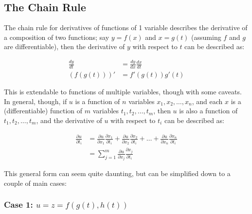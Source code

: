 \documentclass[12pt]{article}
\begin{document}


\subsection{The Chain Rule}

The chain rule for derivatives of functions of 1 variable describes the derivative of a composition of two functions; say $y=f(x)$ and $x=g(t)$ (assuming $f$ and $g$ are differentiable), then the derivative of $y$ with respect to $t$ can be described as:

\begin{equation}
    \begin{split}
       \frac{dy}{dt} &= \frac{dy}{dx}\frac{dx}{dt}\\
        (f(g(t)))' &= f'(g(t))g'(t)
    \end{split}
\end{equation}

This is extendable to functions of multiple variables, though with some caveats. In general, though, if $u$ is a function of $n$ variables $x_1, x_2, \dots, x_n$, and each $x$ is a (differentiable) function of $m$ variables $t_1, t_2, \dots, t_m$, then $u$ is also a function of $t_1, t_2, \dots, t_m$, and the derivative of $u$ with respect to $t_i$ can be described as:

\begin{equation}
    \begin{split}
        \frac{\partial u}{\partial t_i} &= \frac{\partial u}{\partial x_1}\frac{\partial x_1}{\partial t_i} + \frac{\partial u}{\partial x_2}\frac{\partial x_2}{\partial t_i} + \dots + \frac{\partial u}{\partial x_n}\frac{\partial x_n}{\partial t_i}\\
        &= \sum_{j=1}^m \frac{\partial u}{\partial x_j}\frac{\partial x_j}{\partial t_i}
    \end{split}
\end{equation}

This general form can seem quite daunting, but can be simplified down to a couple of main cases:

\subsubsection*{\texorpdfstring{Case 1: $u=z=f(g(t),h(t))$}{A function of two parametrically defined functions in terms of a single variable}}
\end{document}
